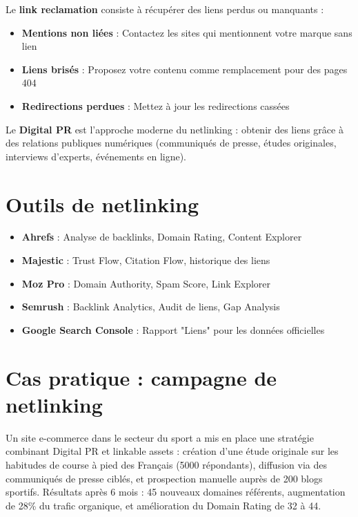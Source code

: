 \documentclass[12pt,a4paper,twoside]{report}
\newcommand{\keyword}[1]{\textbf{\textcolor{googleblue}{#1}}}
\begin{document}
Le \keyword{link reclamation} consiste à récupérer des liens perdus ou manquants :

\begin{itemize}
    \item \textbf{Mentions non liées} : Contactez les sites qui mentionnent votre marque sans lien
    \item \textbf{Liens brisés} : Proposez votre contenu comme remplacement pour des pages 404
    \item \textbf{Redirections perdues} : Mettez à jour les redirections cassées
\end{itemize}

Le \keyword{Digital PR} est l'approche moderne du netlinking : obtenir des liens grâce à des relations publiques numériques (communiqués de presse, études originales, interviews d'experts, événements en ligne).

\section{Outils de netlinking}

\begin{itemize}
    \item \textbf{Ahrefs} : Analyse de backlinks, Domain Rating, Content Explorer
    \item \textbf{Majestic} : Trust Flow, Citation Flow, historique des liens
    \item \textbf{Moz Pro} : Domain Authority, Spam Score, Link Explorer
    \item \textbf{Semrush} : Backlink Analytics, Audit de liens, Gap Analysis
    \item \textbf{Google Search Console} : Rapport "Liens" pour les données officielles
\end{itemize}

\section{Cas pratique : campagne de netlinking}

Un site e-commerce dans le secteur du sport a mis en place une stratégie combinant Digital PR et linkable assets : création d'une étude originale sur les habitudes de course à pied des Français (5000 répondants), diffusion via des communiqués de presse ciblés, et prospection manuelle auprès de 200 blogs sportifs. Résultats après 6 mois : 45 nouveaux domaines référents, augmentation de 28\% du trafic organique, et amélioration du Domain Rating de 32 à 44.
\end{document}
